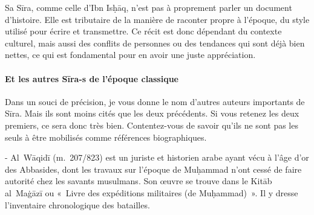 Sa Sīra, comme celle d'Ibn Isḥāq, n'est pas à proprement parler un
document d'histoire. Elle est tributaire de la manière de raconter
propre à l'époque, du style utilisé pour écrire et transmettre. Ce récit
est donc dépendant du contexte culturel, mais aussi des conflits de
personnes ou des tendances qui sont déjà bien nettes, ce qui est
fondamental pour en avoir une juste appréciation.


\paragraph{Et les autres Sīra-s de l'époque
classique}

Dans un souci de précision, je vous donne le nom d'autres auteurs
importants de Sīra. Mais ils sont moins cités que les deux précédents.
Si vous retenez les deux premiers, ce sera donc très bien.
Contentez-vous de savoir qu'ils ne sont pas les seuls à être mobilisés
comme références biographiques.

- Al~Wāqidī (m.~207/823) est un juriste et historien arabe ayant vécu à
l'âge d'or des Abbasides, dont les travaux sur l'époque de Muḥammad
n'ont cessé de faire autorité chez les savants musulmans. Son œuvre se
trouve dans le Kitāb al~Maġāzī ou «~Livre des expéditions militaires (de
Muḥammad)~». Il y dresse
l'inventaire chronologique des batailles.

